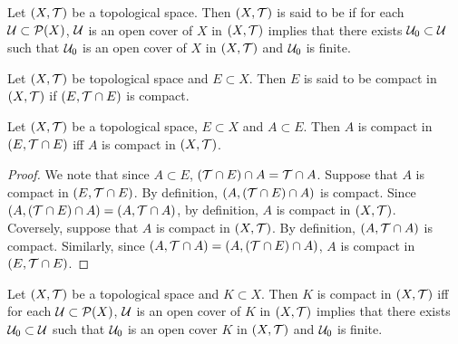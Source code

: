 \documentclass{book}
\begin{document}
	\begin{defn} 
		Let $(X, \mathcal{T})$ be a topological space. Then $(X, \mathcal{T})$ is said to be  if for each $\mathcal{U} \subset \mathcal{P}(X)$, $\mathcal{U}$ is an open cover of $X$ in $(X, \mathcal{T})$ implies that there exists $\mathcal{U}_0 \subset \mathcal{U}$ such that $\mathcal{U}_0$ is an open cover of $X$ in $(X, \mathcal{T})$ and $\mathcal{U}_0$ is finite.
	\end{defn}

	\begin{defn} 
		Let $(X, \mathcal{T})$ be topological space and $E \subset X$. Then $E$ is said to be compact in $(X, \mathcal{T})$ if $(E, \mathcal{T} \cap E)$ is compact. 
	\end{defn}

	\begin{ex} 
		Let $(X, \mathcal{T})$ be a topological space, $E \subset X$ and $A \subset E$. Then $A$ is compact in $(E, \mathcal{T} \cap E)$ iff $A$ is compact in $(X, \mathcal{T})$.
	\end{ex}

	\begin{proof}
		We note that since $A \subset E$, $(\mathcal{T} \cap E) \cap A = \mathcal{T} \cap A$. Suppose that $A$ is compact in $(E, \mathcal{T} \cap E)$. By definition, $(A, (\mathcal{T} \cap E) \cap A)$ is compact. Since $(A, (\mathcal{T} \cap E) \cap A) = (A, \mathcal{T} \cap A)$, by definition, $A$ is compact in $(X, \mathcal{T})$.\\
		Coversely, suppose that $A$ is compact in $(X, \mathcal{T})$. By definition, $(A, \mathcal{T} \cap A)$ is compact. Similarly, since $ (A, \mathcal{T} \cap A) = (A, (\mathcal{T} \cap E) \cap A)$, $A$ is compact in $(E, \mathcal{T} \cap E)$.
	\end{proof}

	\begin{ex} 
		Let $(X, \mathcal{T})$ be a topological space and $K \subset X$. Then $K$ is compact in $(X, \mathcal{T})$ iff for each $\mathcal{U} \subset \mathcal{P}(X)$, $\mathcal{U}$ is an open cover of $K$ in $(X, \mathcal{T})$ implies that there exists $\mathcal{U}_0 \subset \mathcal{U}$ such that $\mathcal{U}_0$ is an open cover $K$ in $(X, \mathcal{T})$ and $\mathcal{U}_0$ is finite.
	\end{ex}
\end{document}

